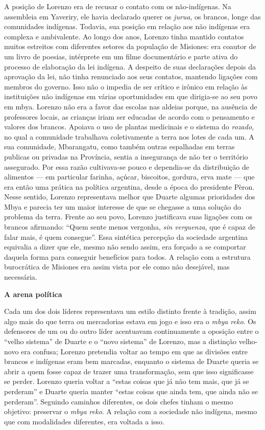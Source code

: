 A posição de Lorenzo era de recusar o contato com os não-indígenas. Na
assembleia em Yaveriry, ele havia declarado querer os \emph{jurua}, os
brancos, longe das comunidades indígenas. Todavia, sua posição em
relação aos não indígenas era complexa e ambivalente. Ao longo dos anos,
Lorenzo tinha mantido contatos muitos estreitos com diferentes setores
da população de Misiones: era coautor de um livro de poesias, intérprete
em um filme documentário e parte ativa do processo de elaboração da lei
indígena. A despeito de suas declarações depois da aprovação da lei, não
tinha renunciado aos seus contatos, mantendo ligações com membros do
governo. Isso não o impedia de ser crítico e irônico em relação às
instituições não indígenas em várias oportunidades em que dirigia-se ao
seu povo em mbya. Lorenzo não era a favor das escolas nas aldeias
porque, na ausência de professores locais, as crianças iriam ser
educadas de acordo com o pensamento e valores dos brancos. Apoiava o uso
de plantas medicinais e o sistema do \emph{rozado,} no qual a comunidade
trabalhava coletivamente a terra nos lotes de cada um. A sua comunidade,
Mbarangatu, como também outras espalhadas em terras publicas ou privadas
na Província, sentia a insegurança de não ter o território assegurado.
Por essa razão cultivava-se pouco e dependia-se da distribuição de
alimentos --- em particular farinha, açúcar, biscoitos, gordura, erva
mate --- que era então uma prática na política argentina, desde a época
do presidente Pèron. Nesse sentido, Lorenzo representava melhor que
Duarte algumas prioridades dos Mbya e parecia ter um maior interesse de
que se chegasse a uma solução do problema da terra. Frente ao seu povo,
Lorenzo justificava suas ligações com os brancos afirmando: ``Quem sente
menos vergonha, \emph{sin verguenza}, que é capaz de falar mais, é quem
consegue''. Essa sintética percepção da sociedade argentina equivalia a
dizer que ele, mesmo não sendo assim, era forçado a se comportar daquela
forma para conseguir benefícios para todos. A relação com a estrutura
burocrática de Misiones era assim vista por ele como não desejável, mas
necessária.

\textbf{A arena política }

Cada um dos dois líderes representava um estilo distinto frente à
tradição, assim algo mais do que terra ou mercadorias estava em jogo e
isso era o \emph{mbya reko}. Os defensores de um ou do outro líder
acentuavam continuamente a oposição entre o ``velho sistema'' de Duarte
e o ``novo sistema'' de Lorenzo, mas a distinção velho-novo era confusa;
Lorenzo pretendia voltar ao tempo em que as divisões entre brancos e
indígenas eram bem marcadas, enquanto o sistema de Duarte queria se
abrir a quem fosse capaz de trazer uma transformação, sem que isso
significasse se perder. Lorenzo queria voltar a ``estas coisas que já
não tem mais, que já se perderam'' e Duarte queria manter ``estas coisas
que ainda tem, que ainda não se perderam''. Seguindo caminhos
diferentes, os dois chefes tinham o mesmo objetivo: preservar o
\emph{mbya reko}. A relação com a sociedade não indígena, mesmo que com
modalidades diferentes, era voltada a isso.

